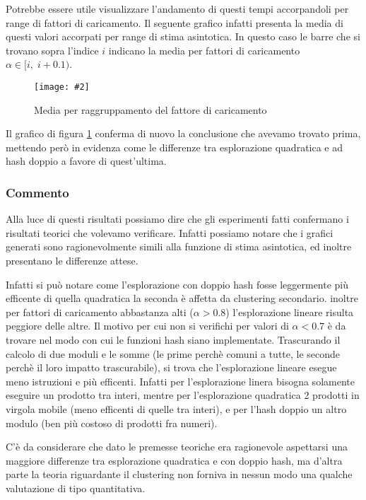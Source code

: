 \documentclass{article}
\newcommand{\image}[3][1]{
	\centering
	\texttt{[image: \#2]}
	\caption{#3}
}
\begin{document}
Potrebbe essere utile visualizzare l'andamento di questi tempi accorpandoli per range di fattori di caricamento. Il seguente grafico infatti presenta la media di questi valori accorpati per range di stima asintotica. In questo caso le barre che si trovano sopra l'indice $i$ indicano la media per fattori di caricamento $\alpha \in [i,\;i+0.1)$.

\begin{figure}[H]
\image[0.75]{Successo_Confronto_barre_scala_logaritmica}{Media per raggruppamento del fattore di caricamento}
\label{fig:Successo_Confronto_barre_scala_logaritmica}
\end{figure}

Il grafico di figura \ref{fig:Successo_Confronto_barre_scala_logaritmica} conferma di nuovo la conclusione che avevamo trovato prima, mettendo però in evidenza come le differenze tra esplorazione quadratica e ad hash doppio a favore di quest'ultima.

\subsubsection{Commento}
Alla luce di questi risultati possiamo dire che gli esperimenti fatti confermano i risultati teorici che volevamo verificare. Infatti possiamo notare che i grafici generati sono ragionevolmente simili alla funzione di stima asintotica, ed inoltre presentano le differenze attese.

Infatti si può notare come l'esplorazione con doppio hash fosse leggermente più efficente di quella quadratica la seconda è affetta da clustering secondario. inoltre per fattori di caricamento abbastanza alti ($\alpha > 0.8$) l'esplorazione lineare risulta peggiore delle altre. Il motivo per cui non si verifichi per valori di $\alpha < 0.7$ è da trovare nel modo con cui le funzioni hash siano implementate. Trascurando il calcolo di due moduli e le somme (le prime perchè comuni a tutte, le seconde perchè il loro impatto trascurabile), si trova che l'esplorazione lineare esegue meno istruzioni e più efficenti. Infatti per l'esplorazione linera bisogna solamente eseguire un prodotto tra interi, mentre per l'esplorazione quadratica 2 prodotti in virgola mobile (meno efficenti di quelle tra interi), e per l'hash doppio un altro modulo (ben più costoso di prodotti fra numeri).

C'è da considerare che dato le premesse teoriche era ragionevole aspettarsi una maggiore differenze tra esplorazione quadratica e con doppio hash, ma d'altra parte la teoria riguardante il clustering non forniva in nessun modo una qualche valutazione di tipo quantitativa.
\end{document}
